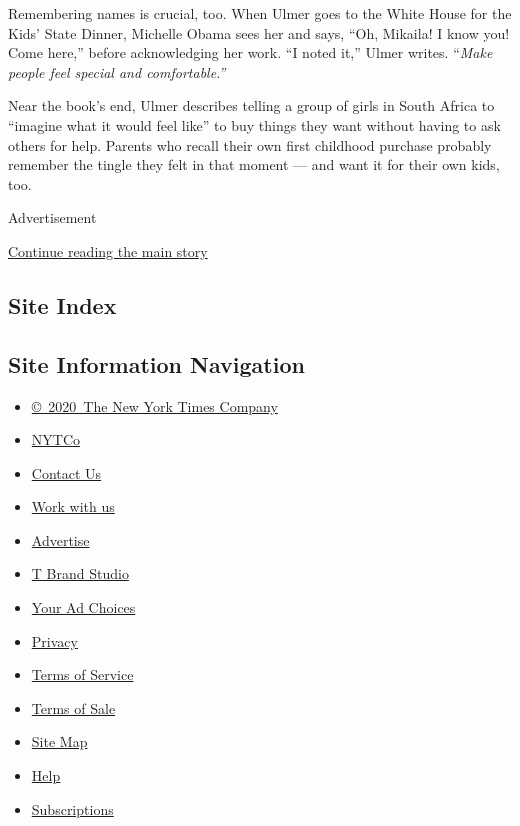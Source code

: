 Remembering names is crucial, too. When Ulmer goes to the White House
for the Kids' State Dinner, Michelle Obama sees her and says, ``Oh,
Mikaila! I know you! Come here,'' before acknowledging her work. ``I
noted it,'' Ulmer writes. ``\emph{Make people feel special and
comfortable.''}

Near the book's end, Ulmer describes telling a group of girls in South
Africa to ``imagine what it would feel like'' to buy things they want
without having to ask others for help. Parents who recall their own
first childhood purchase probably remember the tingle they felt in that
moment --- and want it for their own kids, too.

Advertisement

\protect\hyperlink{after-bottom}{Continue reading the main story}

\hypertarget{site-index}{%
\subsection{Site Index}\label{site-index}}

\hypertarget{site-information-navigation}{%
\subsection{Site Information
Navigation}\label{site-information-navigation}}

\begin{itemize}
\tightlist
\item
  \href{https://help.nytimes3xbfgragh.onion/hc/en-us/articles/115014792127-Copyright-notice}{©~2020~The
  New York Times Company}
\end{itemize}

\begin{itemize}
\tightlist
\item
  \href{https://www.nytco.com/}{NYTCo}
\item
  \href{https://help.nytimes3xbfgragh.onion/hc/en-us/articles/115015385887-Contact-Us}{Contact
  Us}
\item
  \href{https://www.nytco.com/careers/}{Work with us}
\item
  \href{https://nytmediakit.com/}{Advertise}
\item
  \href{http://www.tbrandstudio.com/}{T Brand Studio}
\item
  \href{https://www.nytimes3xbfgragh.onion/privacy/cookie-policy\#how-do-i-manage-trackers}{Your
  Ad Choices}
\item
  \href{https://www.nytimes3xbfgragh.onion/privacy}{Privacy}
\item
  \href{https://help.nytimes3xbfgragh.onion/hc/en-us/articles/115014893428-Terms-of-service}{Terms
  of Service}
\item
  \href{https://help.nytimes3xbfgragh.onion/hc/en-us/articles/115014893968-Terms-of-sale}{Terms
  of Sale}
\item
  \href{https://spiderbites.nytimes3xbfgragh.onion}{Site Map}
\item
  \href{https://help.nytimes3xbfgragh.onion/hc/en-us}{Help}
\item
  \href{https://www.nytimes3xbfgragh.onion/subscription?campaignId=37WXW}{Subscriptions}
\end{itemize}
